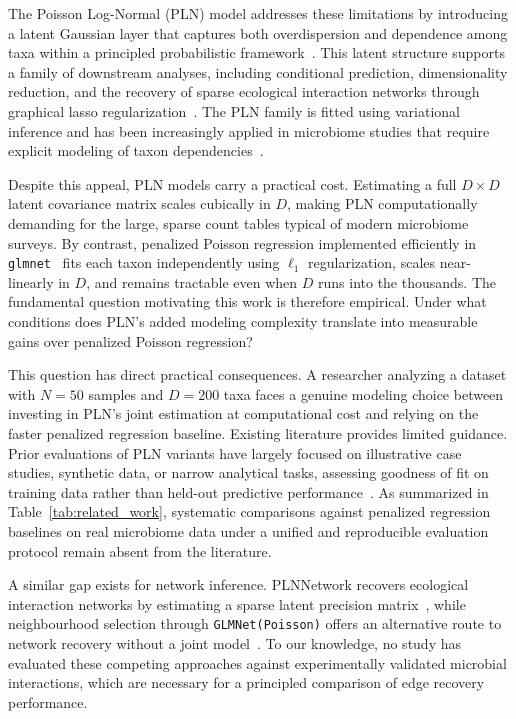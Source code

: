 \documentclass{jmlr}
\begin{document}
The Poisson Log-Normal (PLN) model addresses these limitations by introducing a latent Gaussian layer that captures both overdispersion and dependence among taxa within a principled probabilistic framework~\cite{aitchison1989multivariate, Chiquet2021}.
This latent structure supports a family of downstream analyses, including conditional prediction, dimensionality reduction, and the recovery of sparse ecological interaction networks through graphical lasso regularization~\cite{chiquet2019variational}.
The PLN family is fitted using variational inference and has been increasingly applied in microbiome studies that require explicit modeling of taxon dependencies~\cite{Chiquet2021, Subedi2025}.

Despite this appeal, PLN models carry a practical cost.
Estimating a full $D \times D$ latent covariance matrix scales cubically in $D$, making PLN computationally demanding for the large, sparse count tables typical of modern microbiome surveys.
By contrast, penalized Poisson regression implemented efficiently in \texttt{glmnet}~\cite{Friedman2010} fits each taxon independently using $\ell_1$ regularization, scales near-linearly in $D$, and remains tractable even when $D$ runs into the thousands.
The fundamental question motivating this work is therefore empirical.
Under what conditions does PLN's added modeling complexity translate into measurable gains over penalized Poisson regression?

This question has direct practical consequences.
A researcher analyzing a dataset with $N = 50$ samples and $D = 200$ taxa faces a genuine modeling choice between investing in PLN's joint estimation at computational cost and relying on the faster penalized regression baseline.
Existing literature provides limited guidance.
Prior evaluations of PLN variants have largely focused on illustrative case studies, synthetic data, or narrow analytical tasks, assessing goodness of fit on training data rather than held-out predictive performance~\cite{Chiquet2021, Batardiere2025ZIPLN, Chaussard2025PLNTree}.
As summarized in Table~\ref{tab:related_work}, systematic comparisons against penalized regression baselines on real microbiome data under a unified and reproducible evaluation protocol remain absent from the literature.

A similar gap exists for network inference.
PLNNetwork recovers ecological interaction networks by estimating a sparse latent precision matrix~\cite{chiquet2019variational}, while neighbourhood selection through \texttt{GLMNet(Poisson)} offers an alternative route to network recovery without a joint model~\cite{Meinshausen2006, Friedman2010}.
To our knowledge, no study has evaluated these competing approaches against experimentally validated microbial interactions, which are necessary for a principled comparison of edge recovery performance.
\end{document}
